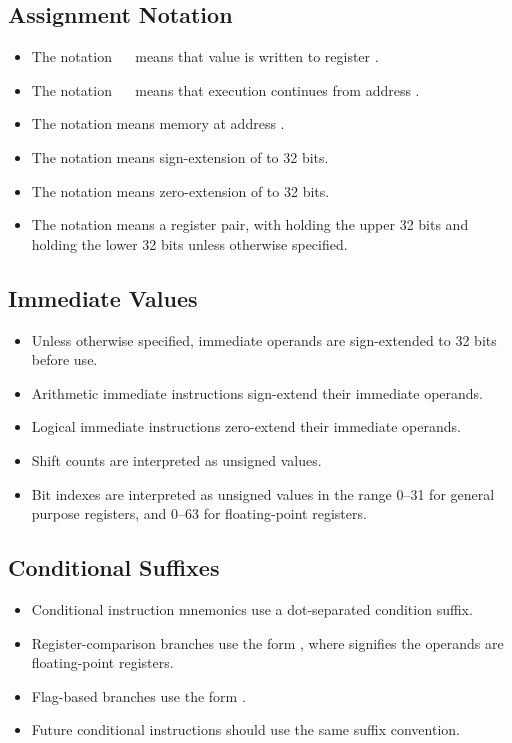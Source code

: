 \subsection{Assignment Notation}

\begin{itemize}
\item The notation ~\assign~ means that value  is
written to register .
\item The notation ~\assign~ means that execution continues
from address .
\item The notation \code{[x]} means memory at address .
\item The notation  means sign-extension of  to 32 bits.
\item The notation  means zero-extension of  to 32 bits.
\item The notation  means a register pair, with  holding the
upper 32 bits and  holding the lower 32 bits unless otherwise specified.
\end{itemize}

\subsection{Immediate Values}

\begin{itemize}
\item Unless otherwise specified, immediate operands are sign-extended to 32
bits before use.
\item Arithmetic immediate instructions sign-extend their immediate operands.
\item Logical immediate instructions zero-extend their immediate operands.
\item Shift counts are interpreted as unsigned values.
\item Bit indexes are interpreted as unsigned values in the range 0--31 for
general purpose registers, and 0--63 for floating-point registers.
\end{itemize}

\subsection{Conditional Suffixes}

\begin{itemize}
\item Conditional instruction mnemonics use a dot-separated condition suffix.
\item Register-comparison branches use the form , where
 signifies the operands are floating-point registers.
\item Flag-based branches use the form .
\item Future conditional instructions should use the same suffix convention.
\end{itemize}

